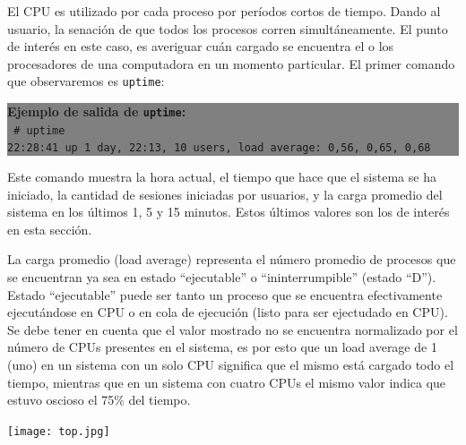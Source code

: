 \documentclass[12pt]{article}
\begin{document}
El CPU es utilizado por cada proceso por períodos cortos de tiempo. Dando 
al usuario, la senación de que todos los procesos corren simultáneamente.
El punto de interés en este caso, es averiguar cuán cargado se encuentra
el o los procesadores de una computadora en un momento particular. El 
primer comando que observaremos es \texttt{uptime}:


\colorbox{grey}{\parbox[t]{0.95\linewidth}{ \vspace*{0.5cm} { 
{\bf Ejemplo de salida de \texttt{uptime}:} \\
{\tt
# uptime \\
 22:28:41 up 1 day, 22:13, 10 users,  load average: 0,56, 0,65, 0,68
}
} \vspace*{0.5cm} } } 

Este comando muestra la hora actual, el tiempo que hace que el sistema se 
ha iniciado, la cantidad de sesiones iniciadas por usuarios, y la carga 
promedio del sistema en los últimos 1, 5 y 15 minutos. Estos últimos valores
son los de interés en esta sección. 

La carga promedio (load average) representa el número promedio de procesos
que se encuentran ya sea en estado ``ejecutable'' o ``ininterrumpible'' 
(estado ``D'').  Estado ``ejecutable'' puede ser tanto un proceso que se 
encuentra efectivamente ejecutándose en CPU o en cola de ejecución 
(listo para ser ejectudado en CPU).  Se debe tener en cuenta que el valor 
mostrado no se encuentra normalizado por el número de CPUs presentes en 
el sistema, es por esto que un load average de 1 (uno) en un sistema con 
un solo CPU significa que el mismo está cargado todo el tiempo, mientras 
que en un sistema con cuatro CPUs el mismo valor indica que estuvo oscioso
el 75\% del tiempo. 


\begin{center}
 \texttt{[image: top.jpg]}
\end{center}



\end{document}
